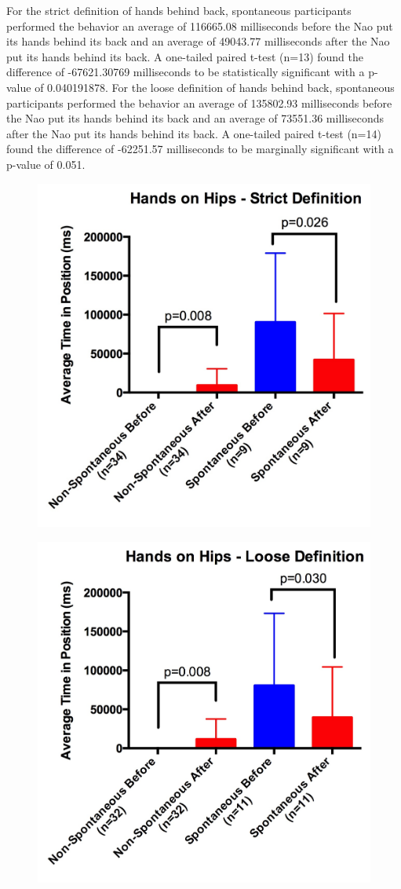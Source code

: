 \documentclass{acm_proc_article-sp}
\begin{document}
For the strict definition of hands behind back, spontaneous participants performed the behavior an average of 116665.08 milliseconds before the Nao put its hands behind its back and an average of 49043.77 milliseconds after the Nao put its hands behind its back. A one-tailed paired t-test (n=13) found the difference of -67621.30769 milliseconds to be statistically significant with a p-value of 0.040191878. For the loose definition of hands behind back, spontaneous participants performed the behavior an average of 135802.93 milliseconds before the Nao put its hands behind its back and an average of 73551.36 milliseconds after the Nao put its hands behind its back. A one-tailed paired t-test (n=14) found the difference of -62251.57 milliseconds to be marginally significant with a p-value of 0.051.

\begin{figure}[t!]
\centering
 \includegraphics[width=0.65\linewidth]{hstrict.jpg}\\
 \label{hstrict} %
\end{figure}

\begin{figure}[t!]
\centering
 \includegraphics[width=0.65\linewidth]{hloose.jpg}\\
 \label{hloose} %
\end{figure}
\end{document}
